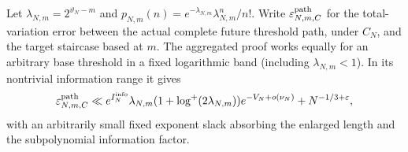 Let $\lambda_{N,m}=2^{\vartheta_N-m}$ and
$p_{N,m}(n)=e^{-\lambda_{N,m}}\lambda_{N,m}^n/n!$.
Write $\varepsilon_{N,m,C}^{\rm path}$ for the total-variation error between
the actual complete future threshold path, under $C_N$, and the target
staircase based at $m$. The aggregated proof works equally for an arbitrary
base threshold in a fixed logarithmic band (including $\lambda_{N,m}<1$).
In its nontrivial information range it gives
\begin{equation}\label{eq:path-error}
 \varepsilon_{N,m,C}^{\rm path}
 \ll e^{I_N^{\rm info}}\lambda_{N,m}
       (1+\log^+(2\lambda_{N,m}))e^{-V_N+o(\nu_N)}
       +N^{-1/3+\varepsilon},
\end{equation}
with an arbitrarily small fixed exponent slack absorbing the enlarged
length and the subpolynomial information factor.

